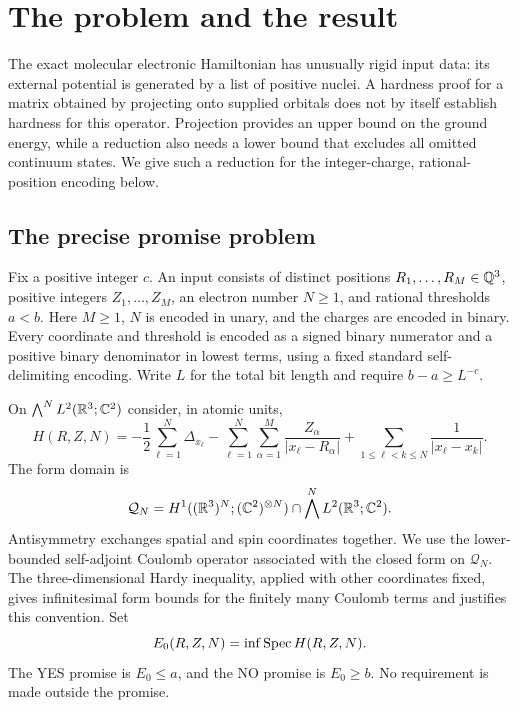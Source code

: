 \section{The problem and the result}\label{sec:introduction}

The exact molecular electronic Hamiltonian has unusually rigid input data: its external potential is generated by a list of positive nuclei. A hardness proof for a matrix obtained by projecting onto supplied orbitals does not by itself establish hardness for this operator. Projection provides an upper bound on the ground energy, while a reduction also needs a lower bound that excludes all omitted continuum states. We give such a reduction for the integer-charge, rational-position encoding below.

\subsection{The precise promise problem}

Fix a positive integer $c$. An input consists of distinct positions $R_1,\ldots,R_M\in\mathbb Q^3$, positive integers $Z_1,\ldots,Z_M$, an electron number $N\ge1$, and rational thresholds $a<b$. Here $M\ge1$, $N$ is encoded in unary, and the charges are encoded in binary. Every coordinate and threshold is encoded as a signed binary numerator and a positive binary denominator in lowest terms, using a fixed standard self-delimiting encoding. Write $L$ for the total bit length and require $b-a\ge L^{-c}$.

On $\bigwedge^N L^2(\mathbb R^3;\mathbb C^2)$ consider, in atomic units,
\begin{equation}\label{eq:physical-hamiltonian}
H(R,Z,N)
=-\frac12\sum_{\ell=1}^N\Delta_{x_\ell}
 -\sum_{\ell=1}^N\sum_{\alpha=1}^M
       \frac{Z_\alpha}{|x_\ell-R_\alpha|}
 +\sum_{1\le\ell<k\le N}\frac1{|x_\ell-x_k|}.
\end{equation}
The form domain is
\[
 \mathcal Q_N=H^1((\mathbb R^3)^N;(\mathbb C^2)^{\otimes N})
       \cap\bigwedge^N L^2(\mathbb R^3;\mathbb C^2).
\]
Antisymmetry exchanges spatial and spin coordinates together. We use the lower-bounded self-adjoint Coulomb operator associated with the closed form on $\mathcal Q_N$. The three-dimensional Hardy inequality, applied with other coordinates fixed, gives infinitesimal form bounds for the finitely many Coulomb terms and justifies this convention. Set
\[
E_0(R,Z,N)=\inf\operatorname{Spec} H(R,Z,N).
\]
The YES promise is $E_0\le a$, and the NO promise is $E_0\ge b$. No requirement is made outside the promise.

